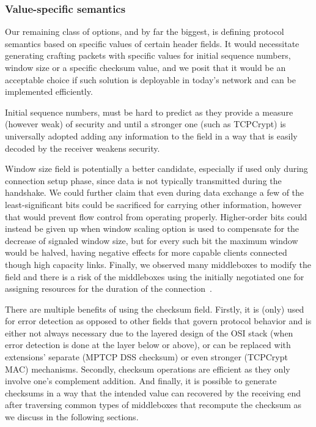 \documentclass{sig-alternate-10pt}
\begin{document}
\subsubsection*{Value-specific semantics}

Our remaining class of options, and by far the biggest, is defining protocol semantics based on specific values of certain header fields. It would necessitate generating crafting packets with specific values for initial sequence numbers, window size or a specific checksum value, and we posit that it would be an acceptable choice if such solution is deployable in today's network and can be implemented efficiently.

Initial sequence numbers, must be hard to predict as they provide a measure (however weak) of security and until a stronger one (such as TCPCrypt) is universally adopted adding any information to the field in a way that is easily decoded by the receiver weakens security.

Window size field is potentially a better candidate, especially if used only during connection setup phase, since data is not typically transmitted during the handshake. We could further claim that even during data exchange a few of the least-significant bits could be sacrificed for carrying other information, however that would prevent flow control from operating properly. Higher-order bits could instead be given up when window scaling option is used to compensate for the decrease of signaled window size, but for every such bit the maximum window would be halved, having negative effects for more capable clients connected though high capacity links. Finally, we observed many middleboxes to modify the field and there is a risk of the middleboxes using the initially negotiated one for assigning resources for the duration of the connection~\cite{}.

There are multiple benefits of using the checksum field. Firstly, it is (only) used for error detection as opposed to other fields that govern protocol behavior and is either not always necessary due to the layered design of the OSI stack (when error detection is done at the layer below or above), or can be replaced with extensions' separate (MPTCP DSS checksum) or even stronger (TCPCrypt MAC) mechanisms. Secondly, checksum operations are efficient as they only involve one's complement addition. And finally, it is possible to generate checksums in a way that the intended value can recovered by the receiving end after traversing common types of middleboxes that recompute the checksum as we discuss in the following sections.
\end{document}
